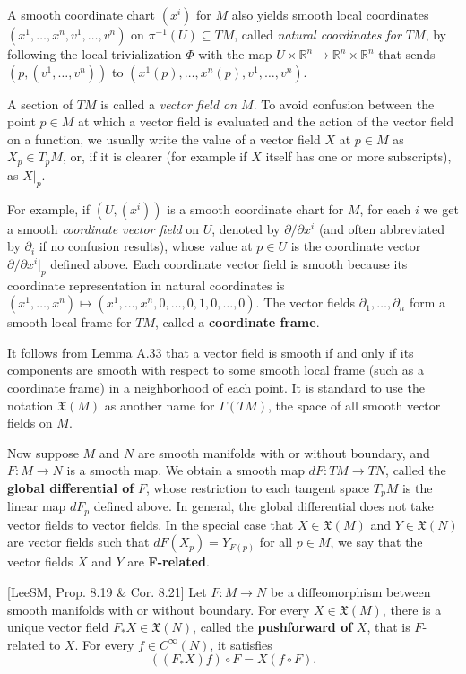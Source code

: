 A smooth coordinate chart $(x^i)$ for $M$ also yields smooth local coordinates $(x^1,\ldots,x^n, v^1, \ldots, v^n)$ on $\pi^{-1}(U) \subseteq TM$, called \emph{natural coordinates for $TM$}, by following the local trivialization $\Phi$ with the map $U \times \mathbb{R}^n \to \mathbb{R}^n \times \mathbb{R}^n$ that sends $(p, (v^1, \ldots, v^n))$ to $(x^1(p), \ldots, x^n(p), v^1, \ldots, v^n)$.

A section of $TM$ is called a \emph{vector field on $M$}. To avoid confusion between the point $p \in M$ at which a vector field is evaluated and the action of the vector field on a function, we usually write the value of a vector field $X$ at $p \in M$ as $X_p \in T_pM$, or, if it is clearer (for example if $X$ itself has one or more subscripts), as $X|_p$.

For example, if $(U, (x^i))$ is a smooth coordinate chart for $M$, for each $i$ we get a smooth \emph{coordinate vector field} on $U$, denoted by $\partial/\partial x^i$ (and often abbreviated by $\partial_i$ if no confusion results), whose value at $p \in U$ is the coordinate vector $\partial/\partial x^i|_p$ defined above. Each coordinate vector field is smooth because its coordinate representation in natural coordinates is $(x^1, \ldots, x^n) \mapsto (x^1, \ldots, x^n, 0, \ldots, 0, 1, 0, \ldots, 0)$. The vector fields $\partial_1, \ldots, \partial_n$ form a smooth local frame for $TM$, called a \textbf{coordinate frame}.

It follows from Lemma A.33 that a vector field is smooth if and only if its components are smooth with respect to some smooth local frame (such as a coordinate frame) in a neighborhood of each point. It is standard to use the notation $\mathfrak{X}(M)$ as another name for $\Gamma(TM)$, the space of all smooth vector fields on $M$.

Now suppose $M$ and $N$ are smooth manifolds with or without boundary, and $F : M \to N$ is a smooth map. We obtain a smooth map $dF : TM \to TN$, called the \textbf{global differential of } $F$, whose restriction to each tangent space $T_p M$ is the linear map $dF_p$ defined above. In general, the global differential does not take vector fields to vector fields. In the special case that $X \in \mathfrak{X}(M)$ and $Y \in \mathfrak{X}(N)$ are vector fields such that $dF(X_p) = Y_{F(p)}$ for all $p \in M$, we say that the vector fields $X$ and $Y$ are \textbf{F-related}.

\begin{lemma}
\label{lem:pushforward-vector-field}
[LeeSM, Prop. 8.19 \& Cor. 8.21] Let $F : M \to N$ be a diffeomorphism between smooth manifolds with or without boundary. For every $X \in \mathfrak{X}(M)$, there is a unique vector field $F_* X \in \mathfrak{X}(N)$, called the \textbf{pushforward of } $X$, that is $F$-related to $X$. For every $f \in C^\infty(N)$, it satisfies
\begin{equation}
((F_* X)f) \circ F = X(f \circ F).
\tag{A.7}
\end{equation}
\end{lemma}

